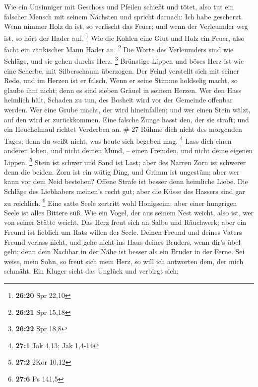  Wie ein Unsinniger mit Geschoss und Pfeilen schießt und
tötet,  also tut ein falscher Mensch mit seinem Nächsten
und spricht darnach: Ich habe gescherzt.  Wenn nimmer
Holz da ist, so verlischt das Feuer; und wenn der Verleumder weg ist, so
hört der Hader auf. \footnote{\textbf{26:20} Spr 22,10} 
Wie die Kohlen eine Glut und Holz ein Feuer, also facht ein zänkischer
Mann Hader an. \footnote{\textbf{26:21} Spr 15,18}  Die
Worte des Verleumders sind wie Schläge, und sie gehen durchs Herz.
\footnote{\textbf{26:22} Spr 18,8}  Brünstige Lippen und
böses Herz ist wie eine Scherbe, mit Silberschaum überzogen.
 Der Feind verstellt sich mit seiner Rede, und im Herzen
ist er falsch.  Wenn er seine Stimme holdselig macht, so
glaube ihm nicht; denn es sind sieben Gräuel in seinem Herzen.
 Wer den Hass heimlich hält, Schaden zu tun, des Bosheit
wird vor der Gemeinde offenbar werden.  Wer eine Grube
macht, der wird hineinfallen; und wer einen Stein wälzt, auf den wird er
zurückkommen.  Eine falsche Zunge hasst den, der sie
straft; und ein Heuchelmaul richtet Verderben an. \# 27 
Rühme dich nicht des morgenden Tages; denn du weißt nicht, was heute
sich begeben mag. \footnote{\textbf{27:1} Jak 4,13; Jak 1,4-14}
 Lass dich einen anderen loben, und nicht deinen Mund, --
einen Fremden, und nicht deine eigenen Lippen. \footnote{\textbf{27:2}
  2Kor 10,12}  Stein ist schwer und Sand ist Last; aber
des Narren Zorn ist schwerer denn die beiden.  Zorn ist
ein wütig Ding, und Grimm ist ungestüm; aber wer kann vor dem Neid
bestehen?  Offene Strafe ist besser denn heimliche Liebe.
 Die Schläge des Liebhabers meinen's recht gut; aber die
Küsse des Hassers sind gar zu reichlich. \footnote{\textbf{27:6} Ps
  141,5}  Eine satte Seele zertritt wohl Honigseim; aber
einer hungrigen Seele ist alles Bittere süß.  Wie ein
Vogel, der aus seinem Nest weicht, also ist, wer von seiner Stätte
weicht.  Das Herz freut sich an Salbe und Räuchwerk; aber
ein Freund ist lieblich um Rats willen der Seele.  Deinen
Freund und deines Vaters Freund verlass nicht, und gehe nicht ins Haus
deines Bruders, wenn dir's übel geht; denn dein Nachbar in der Nähe ist
besser als ein Bruder in der Ferne.  Sei weise, mein
Sohn, so freut sich mein Herz, so will ich antworten dem, der mich
schmäht.  Ein Kluger sieht das Unglück und verbirgt sich;
